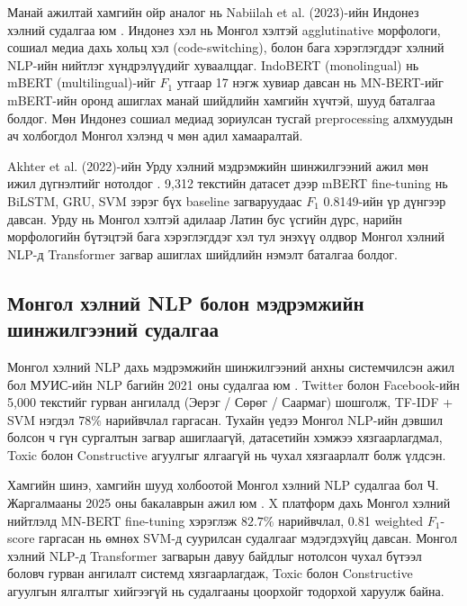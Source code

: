 Манай ажилтай хамгийн ойр аналог нь Nabiilah et al. (2023)-ийн Индонез хэлний
судалгаа юм \cite{nabiilah2023}. Индонез хэл нь Монгол хэлтэй agglutinative
морфологи, сошиал медиа дахь хольц хэл (code-switching), болон бага хэрэглэгддэг
хэлний NLP-ийн нийтлэг хүндрэлүүдийг хуваалцдаг. IndoBERT (monolingual) нь
mBERT (multilingual)-ийг $F_1$ утгаар 17 нэгж хувиар давсан нь MN-BERT-ийг
mBERT-ийн оронд ашиглах манай шийдлийн хамгийн хүчтэй, шууд баталгаа болдог.
Мөн Индонез сошиал медиад зориулсан тусгай preprocessing алхмуудын ач холбогдол
Монгол хэлэнд ч мөн адил хамааралтай.

Akhter et al. (2022)-ийн Урду хэлний мэдрэмжийн шинжилгээний ажил мөн ижил
дүгнэлтийг нотолдог \cite{akhter2022}. 9,312 текстийн датасет дээр mBERT
fine-tuning нь BiLSTM, GRU, SVM зэрэг бүх baseline загваруудаас $F_1$ 0.8149-ийн
үр дүнгээр давсан. Урду нь Монгол хэлтэй адилаар Латин бус үсгийн дүрс, нарийн
морфологийн бүтэцтэй бага хэрэглэгддэг хэл тул энэхүү олдвор Монгол хэлний
NLP-д Transformer загвар ашиглах шийдлийн нэмэлт баталгаа болдог.

\subsection{Монгол хэлний NLP болон мэдрэмжийн шинжилгээний судалгаа}

Монгол хэлний NLP дахь мэдрэмжийн шинжилгээний анхны системчилсэн ажил бол
МУИС-ийн NLP багийн 2021 оны судалгаа юм \cite{mnunlp2021}. Twitter болон
Facebook-ийн 5,000 текстийг гурван ангилалд (Эерэг / Сөрөг / Саармаг)
шошголж, TF-IDF + SVM нэгдэл $78\%$ нарийвчлал гаргасан. Тухайн үедээ Монгол
NLP-ийн дэвшил болсон ч гүн сургалтын загвар ашиглаагүй, датасетийн хэмжээ
хязгаарлагдмал, Toxic болон Constructive агуулгыг ялгаагүй нь чухал хязгаарлалт
болж үлдсэн.

Хамгийн шинэ, хамгийн шууд холбоотой Монгол хэлний NLP судалгаа бол Ч.
Жаргалмааны 2025 оны бакалаврын ажил юм \cite{jargalmaa2025}. X платформ дахь
Монгол хэлний нийтлэлд MN-BERT fine-tuning хэрэглэж $82.7\%$ нарийвчлал, 0.81
weighted $F_1$-score гаргасан нь өмнөх SVM-д суурилсан судалгааг мэдэгдэхүйц
давсан. Монгол хэлний NLP-д Transformer загварын давуу байдлыг нотолсон чухал
бүтээл боловч гурван ангилалт системд хязгаарлагдаж, Toxic болон Constructive
агуулгын ялгалтыг хийгээгүй нь судалгааны цоорхойг тодорхой харуулж байна.

